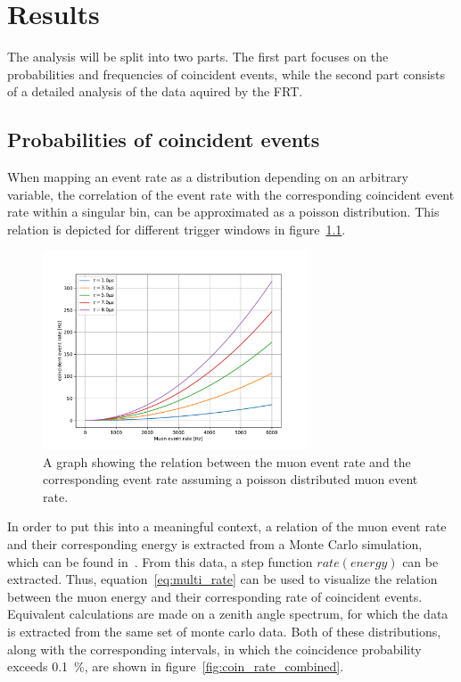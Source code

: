 \chapter{Results}\label{chap:results}

The analysis will be split into two parts. The first part focuses on the probabilities and frequencies of coincident events, while the second part 
consists of a detailed analysis of the data aquired by the FRT. 

\section{Probabilities of coincident events}\label{sec:muon_coincidence}

When mapping an event rate as a distribution depending on an arbitrary variable, the correlation of the event rate with the corresponding coincident event rate 
within a singular bin, can be approximated as a poisson distribution.
This relation is depicted for different trigger windows in figure~\ref{fig:coin_rate_rate}. 

\begin{figure}
    \centering
    \includegraphics[width=0.7\textwidth]{Plots/coincidence_rate_poisson.pdf}
    \caption{A graph showing the relation between the muon event rate and the corresponding event rate assuming a poisson distributed muon event rate.}
    \label{fig:coin_rate_rate}
\end{figure}

In order to put this into a meaningful context, a relation of the muon event rate and their corresponding energy is extracted from a Monte Carlo simulation, which can 
be found in~\cite{IceProdDataset}.
From this data, a step function $rate(energy)$ can be extracted. Thus, equation~\ref{eq:multi_rate} can be used to visualize the relation between the muon energy and their 
corresponding rate of coincident events. Equivalent calculations are made on a zenith angle spectrum, for which the data is extracted from the same set of monte 
carlo data. Both of these distributions, along with the corresponding intervals, in which the coincidence probability exceeds \SI{0.1}{\percent}, are shown in 
figure~\ref{fig:coin_rate_combined}.

